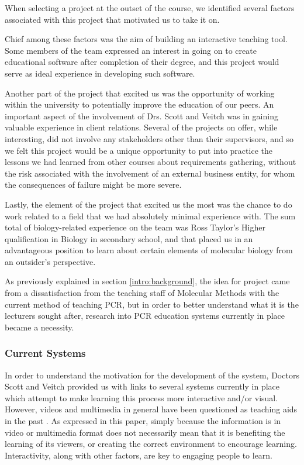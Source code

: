 When selecting a project at the outset of the course, we identified
several factors associated with this project that motivated us to take 
it on.

Chief among these factors was the aim of building an interactive teaching
tool. Some members of the team expressed an interest in going on to
create educational software after completion of their degree, and this
project would serve as ideal experience in developing such software.

Another part of the project that excited us was the opportunity of working
within the university to potentially improve the education of our peers.
An important aspect of the involvement of Drs. Scott and Veitch was in
gaining valuable experience in client relations.
Several of the projects on offer, while interesting, did not involve
any stakeholders other than their supervisors, and so we felt this
project would be a unique opportunity to put into practice the lessons
we had learned from other courses about requirements gathering,
without the risk associated with the involvement of an external
business entity, for whom the consequences of failure might be more
severe.

Lastly, the element of the project that excited us the most was the chance
to do work related to a field that we had absolutely minimal experience
with. 
The sum total of biology-related experience on the team was Ross 
Taylor's Higher qualification in Biology in secondary school, and that
placed us in an advantageous position to learn about certain elements
of molecular biology from an outsider's perspective.

As previously explained in section \ref{intro:background}, the idea
for project came from a dissatisfaction from the teaching staff of
Molecular Methods with the current method of teaching PCR, but in
order to better understand what it is the lecturers sought after,
research into PCR education systems currently in place became a
necessity.

\subsubsection{Current Systems}
\label{intro:currentSystems}
In order to understand the motivation for the development of the
system, Doctors Scott and Veitch provided us with links to several systems 
currently in place which attempt to make learning this process more 
interactive and/or visual. However, videos and multimedia in general 
have been questioned as teaching aids in the past 
\cite{gamingRedefines2004}. As expressed in this paper, simply because 
the information is in video or multimedia format does not necessarily 
mean that it is benefiting the learning of its viewers, or creating the 
correct environment to encourage learning. Interactivity, along with 
other factors, are key to engaging people to learn.

